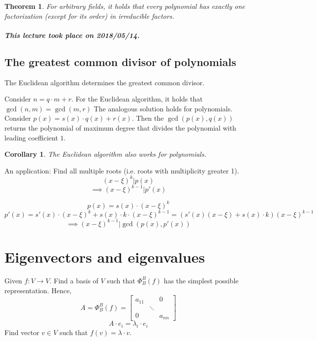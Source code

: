 \documentclass{article}
\newtheorem{theorem}{Theorem}  \numberwithin{theorem}{section}
\newtheorem*{corollary}{Corollary}%
\newcommand{\dateref}[1]{\paragraph{\textit{This lecture took place on #1.}}}
\begin{document}
\begin{theorem} %
  For arbitrary fields, it holds that
  every polynomial has exactly one factorization (except for its order) in irreducible factors.
\end{theorem}

\dateref{2018/05/14}

\subsection{The greatest common divisor of polynomials}

The Euclidean algorithm determines the greatest common divisor.

Consider $n = q \cdot m + r$. For the Euclidean algorithm, it holds that $\operatorname{gcd}(n, m) = \operatorname{gcd}(m, r)$
The analogous solution holds for polynomials. Consider $p(x) = s(x) \cdot q(x) + r(x)$.
Then the $\operatorname{gcd}(p(x), q(x))$ returns the polynomial of maximum degree that divides the polynomial with leading coefficient $1$.

\begin{corollary}
  The Euclidean algorithm also works for polynomials.
\end{corollary}

An application: Find all multiple roots (i.e. roots with multiplicity greater 1).
\[ (x - \xi)^k | p(x) \]
\[ \implies (x - \xi)^{k-1} | p'(x) \]

\[ p(x) = s(x) \cdot (x - \xi)^k \]
\[ p'(x) = s'(x) \cdot (x - \xi)^k + s(x) \cdot k \cdot (x - \xi)^{k-1} = (s'(x) (x - \xi) + s(x) \cdot k) (x - \xi)^{k-1} \]
\[ \implies (x - \xi)^{k-1} | \operatorname{gcd}(p(x), p'(x)) \]

\section{Eigenvectors and eigenvalues}

Given $f: V \to V$. Find a basis of $V$ such that $\Phi_B^B(f)$ has the simplest possible representation.
Hence,
\[ A = \Phi_B^B(f) = \begin{bmatrix} a_{11} &  & 0 \\ & \ddots & \\ 0 &  & a_{nn} \end{bmatrix} \]
\[ A \cdot e_i = \lambda_i \cdot e_i \]
Find vector $v \in V$ such that $f(v) = \lambda \cdot v$.
\end{document}
